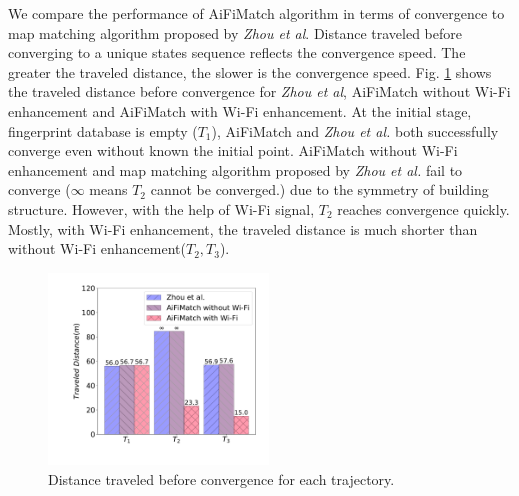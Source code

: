 \documentclass{llncs}
\begin{document}
We compare the performance of AiFiMatch algorithm in terms of convergence to map matching algorithm proposed by \emph{Zhou et al}. Distance traveled before converging to a unique states sequence reflects the convergence speed. The greater the traveled distance, the slower is the convergence speed. Fig. \ref{fig-converg} shows the traveled distance before convergence for \emph{Zhou et al}, AiFiMatch without Wi-Fi enhancement and AiFiMatch with Wi-Fi enhancement. At the initial stage, fingerprint database is empty ($T_1$), AiFiMatch and \emph{Zhou et al.} both successfully converge even without known the initial point. AiFiMatch without Wi-Fi enhancement and map matching algorithm proposed by \emph{Zhou et al.} fail to converge ($\infty$ means $T_2$ cannot be converged.) due to the symmetry of building structure. However, with the help of Wi-Fi signal, $T_2$ reaches convergence quickly. Mostly, with Wi-Fi enhancement, the traveled distance is much shorter than without Wi-Fi enhancement($T_2, T_3$). 


\begin{figure}[!htbp]
	\centering
	\includegraphics[width=2.3in]{AiFiMatch-Convergence}
	\caption{Distance traveled before convergence for each trajectory.}
	\label{fig-converg}
\end{figure}
\end{document}
